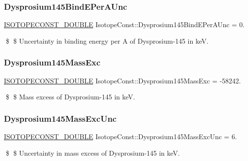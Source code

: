 \subsubsection{\texorpdfstring{Dysprosium145\+Bind\+E\+Per\+A\+Unc}{Dysprosium145BindEPerAUnc}}
{\footnotesize\ttfamily \mbox{\hyperlink{group___isotope_const-_macros_ga8f45a7272ce02c0b4c65c44636ed719a}{I\+S\+O\+T\+O\+P\+E\+C\+O\+N\+S\+T\+\_\+\+D\+O\+U\+B\+LE}} Isotope\+Const\+::\+Dysprosium145\+Bind\+E\+Per\+A\+Unc = 0.}

\$ \$ Uncertainty in binding energy per A of Dysprosium-\/145 in keV. \mbox{\label{group___isotope_const-_dysprosium-_dy145_ga5fa0e72dc68f884044840f5c3649cfb6}} 
\subsubsection{\texorpdfstring{Dysprosium145\+Mass\+Exc}{Dysprosium145MassExc}}
{\footnotesize\ttfamily \mbox{\hyperlink{group___isotope_const-_macros_ga8f45a7272ce02c0b4c65c44636ed719a}{I\+S\+O\+T\+O\+P\+E\+C\+O\+N\+S\+T\+\_\+\+D\+O\+U\+B\+LE}} Isotope\+Const\+::\+Dysprosium145\+Mass\+Exc = -\/58242.}

\$ \$ Mass excess of Dysprosium-\/145 in keV. \mbox{\label{group___isotope_const-_dysprosium-_dy145_ga611a9e12988efeb985a3c710b0c20042}} 
\subsubsection{\texorpdfstring{Dysprosium145\+Mass\+Exc\+Unc}{Dysprosium145MassExcUnc}}
{\footnotesize\ttfamily \mbox{\hyperlink{group___isotope_const-_macros_ga8f45a7272ce02c0b4c65c44636ed719a}{I\+S\+O\+T\+O\+P\+E\+C\+O\+N\+S\+T\+\_\+\+D\+O\+U\+B\+LE}} Isotope\+Const\+::\+Dysprosium145\+Mass\+Exc\+Unc = 6.}

\$ \$ Uncertainty in mass excess of Dysprosium-\/145 in keV. \mbox{\label{group___isotope_const-_dysprosium-_dy145_gab0358176a9a23dc3bf148371a5fa8267}} 
